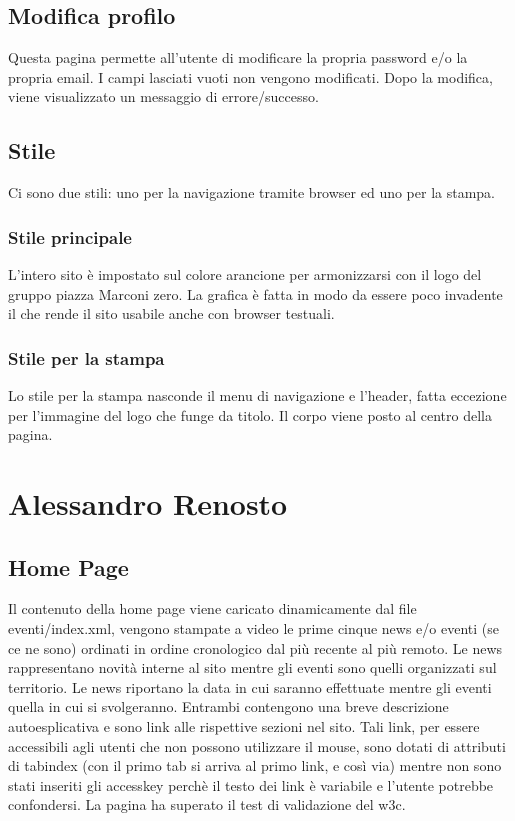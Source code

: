 \documentclass[a4paper,10pt]{article}
\begin{document}
\subsection{Modifica profilo}

Questa pagina permette all'utente di modificare la propria password e/o la propria email. I campi lasciati vuoti non vengono modificati. Dopo la modifica, viene visualizzato un messaggio di errore/successo.

\subsection{Stile}

Ci sono due stili: uno per la navigazione tramite browser ed uno per la stampa.

\subsubsection{Stile principale}
L'intero sito \`e impostato sul colore arancione per armonizzarsi con il logo del gruppo piazza Marconi zero. La grafica \`e fatta in modo da essere poco invadente il che rende il sito usabile anche con browser testuali.

\subsubsection{Stile per la stampa}
Lo stile per la stampa nasconde il menu di navigazione e l'header, fatta eccezione per l'immagine del logo che funge da titolo. Il corpo viene posto al centro della pagina.

\section{Alessandro Renosto}

\subsection{Home Page}

Il contenuto della home page viene caricato dinamicamente dal file eventi/index.xml, vengono stampate a video le prime
 cinque news e/o eventi (se ce ne sono) ordinati in ordine cronologico dal pi\`u recente al pi\`u remoto. Le news rappresentano novit\`a interne al sito mentre gli eventi sono quelli organizzati sul territorio. Le news riportano la data in cui saranno effettuate mentre gli eventi quella in cui si svolgeranno. 
Entrambi contengono una breve descrizione autoesplicativa e sono link alle rispettive sezioni nel sito. Tali link, per essere accessibili agli utenti che non possono utilizzare il mouse, sono dotati di attributi di tabindex (con il primo tab si arriva al primo link, e cos\`i via) mentre non sono stati inseriti gli accesskey perch\`e il testo dei link \`e variabile e l'utente potrebbe confondersi. La pagina ha superato il test di validazione del w3c.
\end{document}
